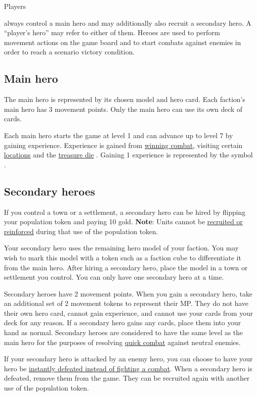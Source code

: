 \hypertarget{Heroes}{Players} always control a main hero and may additionally also recruit a secondary hero.
A “player’s hero” may refer to either of them.
Heroes are used to perform movement actions on the game board and to start combats against enemies in order to reach a scenario victory condition.

\subsection*{Main hero}
The main hero is represented by its chosen model and hero card.
Each faction’s main hero has 3 movement points.
Only the main hero can use its own deck of cards.\par
Each main hero starts the game at level 1 and can advance up to level 7 by gaining experience.
Experience is gained from \hyperlink{Combatexperience}{winning combat}, visiting certain \hyperlink{All}{locations} and the \hyperlink{Resources}{treasure die} .
Gaining 1 experience is represented by the symbol .

\subsection*{\hypertarget{Secondary}{Secondary heroes}}
If you control a town or a settlement, a secondary hero can be hired by flipping your population token and paying 10 gold.
\textbf{Note}: Units cannot be \hyperlink{Units}{recruited or reinforced} during that use of the population token.\par
Your secondary hero uses the remaining hero model of your faction.
You may wish to mark this model with a token such as a faction cube to differentiate it from the main hero.
After hiring a secondary hero, place the model in a town or settlement you control.
You can only have one secondary hero at a time.\par
Secondary heroes have 2 movement points.
When you gain a secondary hero, take an additional set of 2 movement tokens to represent their MP.
They do not have their own hero card, cannot gain experience, and cannot use your cards from your deck for any reason.
If a secondary hero gains any cards, place them into your hand as normal.
Secondary heroes are considered to have the same level as the main hero for the purposes of resolving \hyperlink{Quick}{quick combat} against neutral enemies.\par
If your secondary hero is attacked by an enemy hero, you can choose to have your hero be \hyperlink{Endcombat}{instantly defeated instead of fighting a combat}.
When a secondary hero is defeated, remove them from the game.
They can be recruited again with another use of the population token.\par

